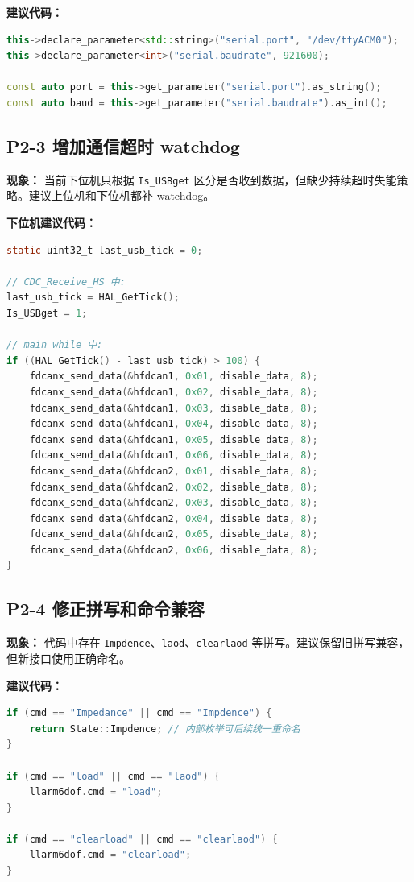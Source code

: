 \documentclass[UTF8,a4paper,11pt]{ctexart}
\begin{document}
\textbf{建议代码：}
\begin{lstlisting}[language=C++]
this->declare_parameter<std::string>("serial.port", "/dev/ttyACM0");
this->declare_parameter<int>("serial.baudrate", 921600);

const auto port = this->get_parameter("serial.port").as_string();
const auto baud = this->get_parameter("serial.baudrate").as_int();
\end{lstlisting}

\subsection{P2-3 增加通信超时 watchdog}

\textbf{现象：} 当前下位机只根据 \verb|Is_USBget| 区分是否收到数据，但缺少持续超时失能策略。建议上位机和下位机都补 watchdog。

\textbf{下位机建议代码：}
\begin{lstlisting}[language=C]
static uint32_t last_usb_tick = 0;

// CDC_Receive_HS 中:
last_usb_tick = HAL_GetTick();
Is_USBget = 1;

// main while 中:
if ((HAL_GetTick() - last_usb_tick) > 100) {
    fdcanx_send_data(&hfdcan1, 0x01, disable_data, 8);
    fdcanx_send_data(&hfdcan1, 0x02, disable_data, 8);
    fdcanx_send_data(&hfdcan1, 0x03, disable_data, 8);
    fdcanx_send_data(&hfdcan1, 0x04, disable_data, 8);
    fdcanx_send_data(&hfdcan1, 0x05, disable_data, 8);
    fdcanx_send_data(&hfdcan1, 0x06, disable_data, 8);
    fdcanx_send_data(&hfdcan2, 0x01, disable_data, 8);
    fdcanx_send_data(&hfdcan2, 0x02, disable_data, 8);
    fdcanx_send_data(&hfdcan2, 0x03, disable_data, 8);
    fdcanx_send_data(&hfdcan2, 0x04, disable_data, 8);
    fdcanx_send_data(&hfdcan2, 0x05, disable_data, 8);
    fdcanx_send_data(&hfdcan2, 0x06, disable_data, 8);
}
\end{lstlisting}

\subsection{P2-4 修正拼写和命令兼容}

\textbf{现象：} 代码中存在 \verb|Impdence|、\verb|laod|、\verb|clearlaod| 等拼写。建议保留旧拼写兼容，但新接口使用正确命名。

\textbf{建议代码：}
\begin{lstlisting}[language=C++]
if (cmd == "Impedance" || cmd == "Impdence") {
    return State::Impdence; // 内部枚举可后续统一重命名
}

if (cmd == "load" || cmd == "laod") {
    llarm6dof.cmd = "load";
}

if (cmd == "clearload" || cmd == "clearlaod") {
    llarm6dof.cmd = "clearload";
}
\end{lstlisting}
\end{document}
